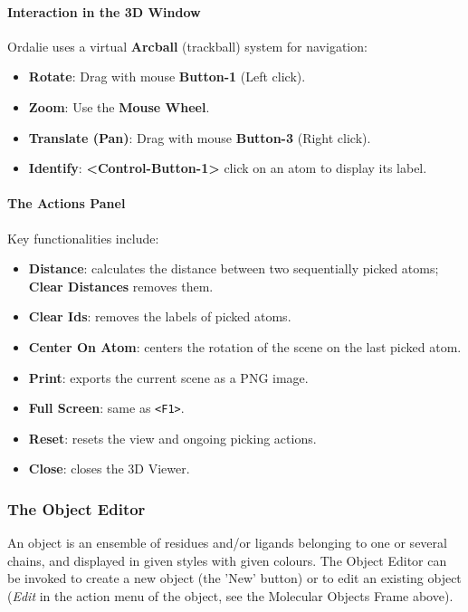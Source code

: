 \documentclass[a4paper]{article}
\begin{document}
\paragraph{Interaction in the 3D Window}
Ordalie uses a virtual \textbf{Arcball} (trackball) system for navigation:
\begin{itemize}
    \item \textbf{Rotate}: Drag with mouse \textbf{Button-1} (Left click).
    \item \textbf{Zoom}: Use the \textbf{Mouse Wheel}.
    \item \textbf{Translate (Pan)}: Drag with mouse \textbf{Button-3} (Right click).
    \item \textbf{Identify}: \textbf{<Control-Button-1>} click on an atom to display its label.
\end{itemize}

\paragraph{The Actions Panel}
Key functionalities include:
\begin{itemize}
    \item \textbf{Distance}: calculates the distance between two sequentially picked atoms; \textbf{Clear Distances} removes them.
    \item \textbf{Clear Ids}: removes the labels of picked atoms.
    \item \textbf{Center On Atom}: centers the rotation of the scene on the last picked atom.
    \item \textbf{Print}: exports the current scene as a PNG image.
    \item \textbf{Full Screen}: same as \texttt{<F1>}.
    \item \textbf{Reset}: resets the view and ongoing picking actions.
    \item \textbf{Close}: closes the 3D Viewer.
\end{itemize}

\subsubsection{The Object Editor}
\label{chap-objecteditor}
An object is an ensemble of residues and/or ligands belonging to one or several chains, and displayed in given styles with given colours. The Object Editor can be invoked to create a new object (the 'New' button) or to edit an existing object (\textit{Edit} in the action menu of the object, see the Molecular Objects Frame above).
\end{document}
